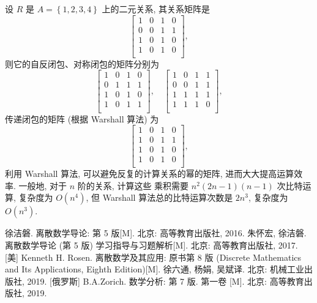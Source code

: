 \documentclass[10pt,UTF8]{book} %
\begin{document}
\begin{exercise}
    设 $R$ 是 $A = \left\{1,2,3,4\right\}$ 上的二元关系,
    其关系矩阵是
    \[ \begin{bmatrix}
        1 & 0 & 1 & 0 \\
        0 & 0 & 1 & 1 \\
        1 & 0 & 1 & 0 \\
        1 & 0 & 1 & 0 \\
    \end{bmatrix}, \]
    则它的自反闭包、对称闭包的矩阵分别为
    \[ \begin{bmatrix}
        1 & 0 & 1 & 0 \\
        0 & 1 & 1 & 1 \\
        1 & 0 & 1 & 0 \\
        1 & 0 & 1 & 1 \\
    \end{bmatrix}, \quad \begin{bmatrix}
        1 & 0 & 1 & 1 \\
        0 & 0 & 1 & 1 \\
        1 & 1 & 1 & 1 \\
        1 & 1 & 1 & 0 \\
    \end{bmatrix}, \]
    传递闭包的矩阵 (根据 Warshall 算法) 为
    \[ \begin{bmatrix}
        1 & 0 & 1 & 0 \\
        1 & 0 & 1 & 1 \\
        1 & 0 & 1 & 0 \\
        1 & 0 & 1 & 0 \\
    \end{bmatrix}, \]
    利用 Warshall 算法, 可以避免反复的计算关系的幂的矩阵,
    进而大大提高运算效率. 一般地, 对于 $n$ 阶的关系, 计算这些
    乘积需要 $n^2(2n-1)(n-1)$ 次比特运算, 复杂度为 $O(n^4)$,
    但 Warshall 算法总的比特运算次数是 $2n^3$, 复杂度为 $O(n^3)$.
\end{exercise}



\onecolumn
\begin{thebibliography}{1}
    徐洁磐. 离散数学导论: 第 5 版[M]. 北京: 高等教育出版社, 2016.
    朱怀宏, 徐洁磐. 离散数学导论 (第 5 版) 学习指导与习题解析[M].
    北京: 高等教育出版社, 2017.
    [美] Kenneth H. Rosen. 离散数学及其应用: 原书第 8 版 (Discrete Mathematics 
    and Its Applications, Eighth Edition)[M]. 徐六通, 杨娟, 吴斌译.
    北京: 机械工业出版社, 2019.
    [俄罗斯] B.A.Zorich. 数学分析: 第 7 版. 第一卷 [M].
    北京: 高等教育出版社, 2019.
\end{thebibliography}

\end{document}
